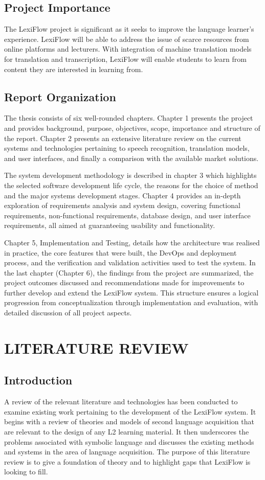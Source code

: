 \documentclass[oneside]{utmthesis}
\begin{document}
\section{Project Importance}
The LexiFlow project is significant as it seeks to improve the language learner's experience. LexiFlow will be able to address the issue of scarce resources from online platforms and lecturers. With integration of machine translation models for translation and transcription, LexiFlow will enable students to learn from content they are interested in learning from.
\section{Report Organization}
The thesis consists of six well-rounded chapters. Chapter 1 presents the project and provides background, purpose, objectives, scope, importance and structure of the report. Chapter 2 presents an extensive literature review on the current systems and technologies pertaining to speech recognition, translation models, and user interfaces, and finally a comparison with the available market solutions.

The system development methodology is described in chapter 3 which highlights the selected software development life cycle, the reasons for the choice of method and the major systems development stages. Chapter 4 provides an in-depth exploration of requirements analysis and system design, covering functional requirements, non-functional requirements, database design, and user interface requirements, all aimed at guaranteeing usability and functionality.

Chapter 5, Implementation and Testing, details how the architecture was realised in practice, the core features that were built, the DevOps and deployment process, and the verification and validation activities used to test the system. In the last chapter (Chapter 6), the findings from the project are summarized, the project outcomes discussed and recommendations made for improvements to further develop and extend the LexiFlow system. This structure ensures a logical progression from conceptualization through implementation and evaluation, with detailed discussion of all project aspects.
\chapter{LITERATURE REVIEW}
\section{Introduction}
A review of the relevant literature and technologies has been conducted to examine existing work pertaining to the development of the LexiFlow system. It begins with a review of theories and models of second language acquisition that are relevant to the design of any L2 learning material. It then underscores the problems associated with symbolic language and discusses the existing methods and systems in the area of language acquisition. The purpose of this literature review is to give a foundation of theory and to highlight gaps that LexiFlow is looking to fill.
\end{document}
